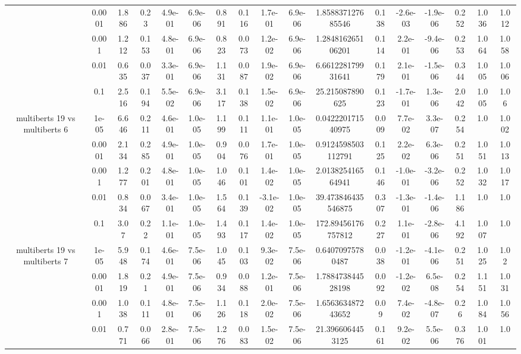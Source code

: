 \begin{tabular}{|c|c|c|c|c|c|c|c|c|c|c|c|c|c|c|c|c|}
 & 0.0001 & 1.886 & 0.23 & 4.9e-01 & 6.9e-06 & 0.891 & 0.116 & 1.7e-01 & 6.9e-06 & 1.858837127685546 & 0.138 & -2.6e-03 & -1.9e-06 & 0.252 & 1.036 & 1.012 \\
 & 0.001 & 1.212 & 0.153 & 4.8e-01 & 6.9e-06 & 0.823 & 0.073 & 1.2e-02 & 6.9e-06 & 1.284816265106201 & 0.114 & 2.2e-01 & -9.4e-06 & 0.253 & 1.064 & 1.058 \\
 & 0.01 & 0.635 & 0.037 & 3.3e-01 & 6.9e-06 & 1.131 & 0.087 & 1.9e-02 & 6.9e-06 & 6.661228179931641 & 0.179 & 2.1e-01 & -1.5e-06 & 0.344 & 1.005 & 1.006 \\
 & 0.1 & 2.516 & 0.194 & 5.5e-02 & 6.9e-06 & 3.117 & 0.138 & 1.5e-02 & 6.9e-06 & 25.215087890625 & 0.123 & -1.7e-01 & 1.3e-06 & 2.042 & 1.005 & 1.06 \\
\hline
\multirow{5}{*}{multiberts 19 vs multiberts 6} & 1e-05 & 6.646 & 0.211 & 4.6e-01 & 1.0e-05 & 1.199 & 0.111 & 1.1e-01 & 1.0e-05 & 0.042220171540975 & 0.009 & 7.7e-02 & 3.3e-07 & 0.254 & 1.0 & 1.002 \\
 & 0.0001 & 2.134 & 0.285 & 4.9e-01 & 1.0e-05 & 0.904 & 0.076 & 1.7e-01 & 1.0e-05 & 0.9124598503112791 & 0.125 & 2.2e-02 & 6.3e-06 & 0.251 & 1.051 & 1.013 \\
 & 0.001 & 1.277 & 0.201 & 4.8e-01 & 1.0e-05 & 1.046 & 0.101 & 1.4e-02 & 1.0e-05 & 2.013825416564941 & 0.146 & -1.0e-01 & -3.2e-06 & 0.252 & 1.032 & 1.017 \\
 & 0.01 & 0.834 & 0.067 & 3.4e-01 & 1.0e-05 & 1.564 & 0.139 & -3.1e-02 & 1.0e-05 & 39.473846435546875 & 0.307 & -1.3e-01 & -1.4e-06 & 1.186 & 1.0 & 1.0 \\
 & 0.1 & 3.07 & 0.22 & 1.1e-01 & 1.0e-05 & 1.493 & 0.117 & 1.4e-02 & 1.0e-05 & 172.89456176757812 & 0.227 & 1.1e-01 & -2.8e-06 & 4.192 & 1.007 & 1.0 \\
\hline
\multirow{5}{*}{multiberts 19 vs multiberts 7} & 1e-05 & 5.948 & 0.174 & 4.6e-01 & 7.5e-06 & 1.045 & 0.103 & 9.3e-02 & 7.5e-06 & 0.64070975780487 & 0.038 & -1.2e-01 & -4.1e-06 & 0.251 & 1.025 & 1.02 \\
 & 0.0001 & 1.819 & 0.21 & 4.9e-01 & 7.5e-06 & 0.934 & 0.088 & 1.2e-01 & 7.5e-06 & 1.788473844528198 & 0.092 & -1.2e-02 & 6.5e-08 & 0.254 & 1.151 & 1.031 \\
 & 0.001 & 1.038 & 0.111 & 4.8e-01 & 7.5e-06 & 1.126 & 0.118 & 2.0e-02 & 7.5e-06 & 1.656363487243652 & 0.09 & 7.4e-02 & -4.8e-07 & 0.26 & 1.084 & 1.056 \\
 & 0.01 & 0.771 & 0.066 & 2.8e-01 & 7.5e-06 & 1.276 & 0.083 & 1.5e-02 & 7.5e-06 & 21.3966064453125 & 0.161 & 9.2e-02 & 5.5e-06 & 0.376 & 1.001 & 1.0 \\

\end{tabular}
